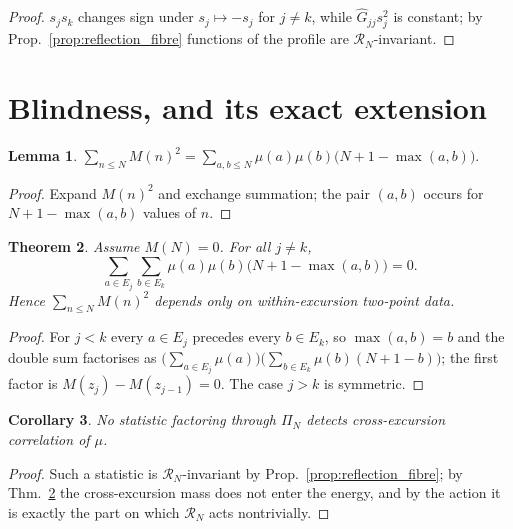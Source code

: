 \documentclass[11pt]{amsart}
\numberwithin{equation}{section}
\theoremstyle{plain}
\newtheorem{theorem}{Theorem}[section]
\newtheorem{lemma}[theorem]{Lemma}
\newtheorem{corollary}[theorem]{Corollary}
\theoremstyle{definition}
\theoremstyle{remark}
\begin{document}
\begin{proof}
$s_js_k$ changes sign under $s_j\mapsto-s_j$ for $j\ne k$, while
$\widehat G_{jj}s_j^2$ is constant; by
Prop.~\ref{prop:reflection_fibre} functions of the profile are
$\mathcal R_N$-invariant.
\end{proof}

\section{Blindness, and its exact extension}
\label{sec:blindness}

\begin{lemma}
\label{lem:energy_as_two_point}
$\displaystyle\sum_{n\le N}M(n)^2
=\sum_{a,b\le N}\mu(a)\mu(b)\bigl(N+1-\max(a,b)\bigr).$
\end{lemma}

\begin{proof}
Expand $M(n)^2$ and exchange summation; the pair $(a,b)$ occurs for
$N+1-\max(a,b)$ values of $n$.
\end{proof}

\begin{theorem}
\label{thm:cross_excursion_vanishing}
Assume $M(N)=0$. For all $j\ne k$,
\begin{equation}
\sum_{a\in E_j}\sum_{b\in E_k}
\mu(a)\mu(b)\bigl(N+1-\max(a,b)\bigr)=0 .
\label{eq:cross_excursion_vanishing}
\end{equation}
Hence $\sum_{n\le N}M(n)^2$ depends only on within-excursion two-point
data.
\end{theorem}

\begin{proof}
For $j<k$ every $a\in E_j$ precedes every $b\in E_k$, so
$\max(a,b)=b$ and the double sum factorises as
$\bigl(\sum_{a\in E_j}\mu(a)\bigr)\bigl(\sum_{b\in E_k}\mu(b)(N+1-b)\bigr)$;
the first factor is $M(z_j)-M(z_{j-1})=0$. The case $j>k$ is symmetric.
\end{proof}

\begin{corollary}
\label{cor:profile_blindness}
No statistic factoring through $\Pi_N$ detects cross-excursion
correlation of $\mu$.
\end{corollary}

\begin{proof}
Such a statistic is $\mathcal R_N$-invariant by
Prop.~\ref{prop:reflection_fibre}; by
Thm.~\ref{thm:cross_excursion_vanishing} the cross-excursion mass does
not enter the energy, and by the action it is exactly the part on which
$\mathcal R_N$ acts nontrivially.
\end{proof}
\end{document}
